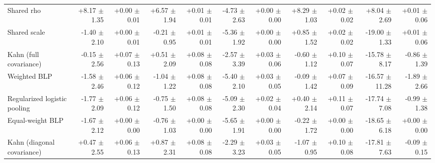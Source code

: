 \begin{tabular}{lrrrrrrrrrr}
Shared rho & +8.17 {\scriptsize $\pm$ 1.35} & +0.00 {\scriptsize $\pm$ 0.01} & +6.57 {\scriptsize $\pm$ 1.94} & +0.01 {\scriptsize $\pm$ 0.01} & -4.73 {\scriptsize $\pm$ 2.63} & +0.00 {\scriptsize $\pm$ 0.00} & +8.29 {\scriptsize $\pm$ 1.03} & +0.02 {\scriptsize $\pm$ 0.02} & +8.04 {\scriptsize $\pm$ 2.69} & +0.01 {\scriptsize $\pm$ 0.06} \\
Shared scale & -1.40 {\scriptsize $\pm$ 2.10} & +0.00 {\scriptsize $\pm$ 0.01} & -0.21 {\scriptsize $\pm$ 0.95} & +0.01 {\scriptsize $\pm$ 0.01} & -5.36 {\scriptsize $\pm$ 1.92} & +0.00 {\scriptsize $\pm$ 0.00} & +0.85 {\scriptsize $\pm$ 1.52} & +0.02 {\scriptsize $\pm$ 0.02} & -19.00 {\scriptsize $\pm$ 1.33} & +0.01 {\scriptsize $\pm$ 0.06} \\
Kahn (full covariance) & -0.15 {\scriptsize $\pm$ 2.56} & +0.07 {\scriptsize $\pm$ 0.13} & +0.51 {\scriptsize $\pm$ 2.09} & +0.08 {\scriptsize $\pm$ 0.08} & -2.57 {\scriptsize $\pm$ 3.39} & +0.03 {\scriptsize $\pm$ 0.06} & -0.60 {\scriptsize $\pm$ 1.12} & +0.10 {\scriptsize $\pm$ 0.07} & -15.78 {\scriptsize $\pm$ 8.17} & -0.86 {\scriptsize $\pm$ 1.39} \\
Weighted BLP & -1.58 {\scriptsize $\pm$ 2.46} & +0.06 {\scriptsize $\pm$ 0.12} & -1.04 {\scriptsize $\pm$ 1.22} & +0.08 {\scriptsize $\pm$ 0.08} & -5.40 {\scriptsize $\pm$ 2.10} & +0.03 {\scriptsize $\pm$ 0.05} & -0.09 {\scriptsize $\pm$ 1.42} & +0.07 {\scriptsize $\pm$ 0.09} & -16.57 {\scriptsize $\pm$ 11.28} & -1.89 {\scriptsize $\pm$ 2.66} \\
Regularized logistic pooling & -1.77 {\scriptsize $\pm$ 2.09} & +0.06 {\scriptsize $\pm$ 0.12} & -0.75 {\scriptsize $\pm$ 1.50} & +0.08 {\scriptsize $\pm$ 0.08} & -5.09 {\scriptsize $\pm$ 2.30} & +0.02 {\scriptsize $\pm$ 0.04} & +0.40 {\scriptsize $\pm$ 2.14} & +0.11 {\scriptsize $\pm$ 0.07} & -17.74 {\scriptsize $\pm$ 7.08} & -0.99 {\scriptsize $\pm$ 1.38} \\
Equal-weight BLP & -1.67 {\scriptsize $\pm$ 2.12} & +0.00 {\scriptsize $\pm$ 0.00} & -0.76 {\scriptsize $\pm$ 1.03} & +0.00 {\scriptsize $\pm$ 0.00} & -5.65 {\scriptsize $\pm$ 1.91} & +0.00 {\scriptsize $\pm$ 0.00} & -0.22 {\scriptsize $\pm$ 1.72} & +0.00 {\scriptsize $\pm$ 0.00} & -18.65 {\scriptsize $\pm$ 6.18} & +0.00 {\scriptsize $\pm$ 0.00} \\
Kahn (diagonal covariance) & +0.47 {\scriptsize $\pm$ 2.55} & +0.06 {\scriptsize $\pm$ 0.13} & +0.87 {\scriptsize $\pm$ 2.31} & +0.08 {\scriptsize $\pm$ 0.08} & -2.29 {\scriptsize $\pm$ 3.23} & +0.03 {\scriptsize $\pm$ 0.05} & -1.07 {\scriptsize $\pm$ 0.95} & +0.10 {\scriptsize $\pm$ 0.08} & -17.81 {\scriptsize $\pm$ 7.63} & -0.09 {\scriptsize $\pm$ 0.15} \\

\end{tabular}

